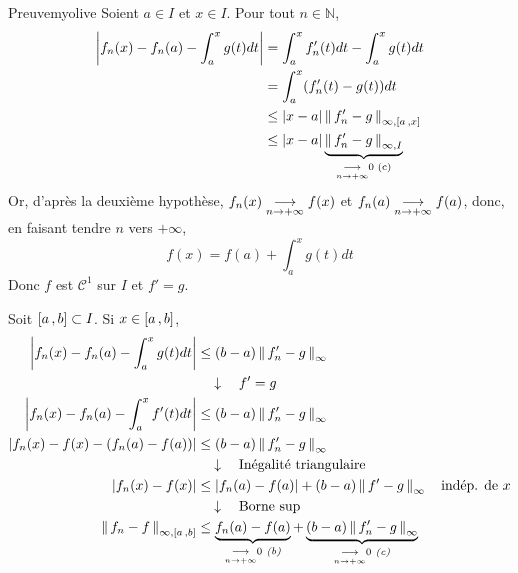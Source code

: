     \begin{demo}{Preuve}{myolive}
        Soient $a \in I$ et $x \in I$. Pour tout $n \in \mathbb{N}$, 
        \begin{align*}
            \abs{f_n(x) - f_n(a) - \int_{a}^{x} g(t)dt}
            &= \int_{a}^{x} f_n'(t)dt - \int_{a}^{x} g(t) dt \\
            &= \int_{a}^{x} (f_n'(t) - g(t))dt \\
            &\leq \abs{x-a} \nnorm{\infty, \intervalleFF{a}{x}}{f_n'-g} \\
            &\leq \abs{x-a} \underbrace{\nnorm{\infty, I}{f_n'-g}}_{\limi{n}{+\infty} 0 \text{ (c)}}
        \end{align*}
        Or, d’après la deuxième hypothèse, $f_n(x) \limi{n}{+\infty} f(x)$ et $f_n(a) \limi{n}{+\infty} f(a)$, donc, en faisant tendre $n$ vers $+\infty$,
        \[ f(x) = f(a) + \int_{a}^{x} g(t)dt \] 
        Donc $f$ est $\mathcal{C}^1$ sur $I$ et $f' = g$.

        Soit $\intervalleFF{a}{b} \subset I$. Si $x \in \intervalleFF{a}{b}$, 
        \begin{align*}
            \abs{f_n(x) - f_n(a) - \int_{a}^{x} g(t)dt} 
            &\leq (b-a) \nnorm{\infty}{f_n'-g} \\
            & \quad \downarrow \quad f' = g \\
            \abs{f_n(x) - f_n(a) - \int_{a}^{x} f'(t)dt} 
            &\leq (b-a) \nnorm{\infty}{f_n'-g} \\
            \abs{f_n(x) - f(x) - \left(f_n(a) - f(a)\right)} 
            &\leq (b-a) \nnorm{\infty}{f_n'-g} \\
            &\quad \downarrow \quad \text{Inégalité triangulaire} \\
            \abs{f_n(x) - f(x)} 
            & \leq \abs{f_n(a) - f(a)} + (b-a) \nnorm{\infty}{f' - g} \quad \text{indép. de } x \\
            & \quad \downarrow \quad \text{Borne sup} \\
            \nnorm{\infty, \intervalleFF{a}{b}}{f_n - f}
            & \leq \underbrace{f_n(a) - f(a)}_{\limi{n}{+\infty} 0 \textit{ (b)}} + \underbrace{(b-a) \nnorm{\infty}{f_n' - g}}_{\limi{n}{+\infty} 0 \textit{ (c)}}
        \end{align*}
    \end{demo}




